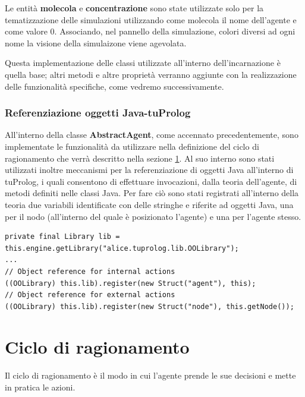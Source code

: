 \documentclass[12pt,a4paper,openright,twoside]{report}
\begin{document}
Le entit\`a \textbf{molecola} e \textbf{concentrazione} sono state utilizzate solo per la tematizzazione delle simulazioni utilizzando come molecola il nome dell'agente e come valore 0. Associando, nel pannello della simulazione, colori diversi ad ogni nome la visione della simulaizone viene agevolata.

\medskip

Questa implementazione delle classi utilizzate all'interno dell'incarnazione \`e quella base; altri metodi e altre propriet\`a verranno aggiunte con la realizzazione delle funzionalit\`a specifiche, come vedremo successivamente.


\subsubsection{Referenziazione oggetti Java-tuProlog}
All'interno della classe \textbf{AbstractAgent}, come accennato precedentemente, sono implementate le funzionalit\`a da utilizzare nella definizione del ciclo di ragionamento che verr\`a descritto nella sezione \ref{CicloDiRagionamento}. Al suo interno sono stati utilizzati inoltre meccanismi per la referenziazione di oggetti Java all'interno di tuProlog, i quali consentono di effettuare invocazioni, dalla teoria dell'agente, di metodi definiti nelle classi Java. Per fare ci\`o sono stati registrati all'interno della teoria due variabili identificate con delle stringhe e riferite ad oggetti Java, una per il nodo (all'interno del quale \`e posizionato l'agente) e una per l'agente stesso.
\medskip
\begin{lstlisting}[label={lst:ObjectReferenceJava},caption={Associazione riferimento oggetti Java per tuProlog}]
private final Library lib = this.engine.getLibrary("alice.tuprolog.lib.OOLibrary");
...
// Object reference for internal actions
((OOLibrary) this.lib).register(new Struct("agent"), this);
// Object reference for external actions
((OOLibrary) this.lib).register(new Struct("node"), this.getNode());
\end{lstlisting}

\section{Ciclo di ragionamento}\label{CicloDiRagionamento}
Il ciclo di ragionamento \`e il modo in cui l'agente prende le sue decisioni e mette in pratica le azioni.
\end{document}
